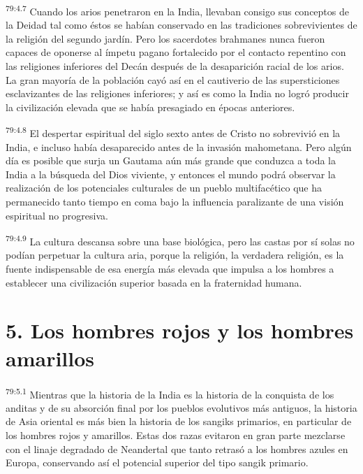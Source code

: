\par
\textsuperscript{79:4.7} Cuando los arios penetraron en la India, llevaban consigo sus conceptos de la Deidad tal como éstos se habían conservado en las tradiciones sobrevivientes de la religión del segundo jardín. Pero los sacerdotes brahmanes nunca fueron capaces de oponerse al ímpetu pagano fortalecido por el contacto repentino con las religiones inferiores del Decán después de la desaparición racial de los arios. La gran mayoría de la población cayó así en el cautiverio de las supersticiones esclavizantes de las religiones inferiores; y así es como la India no logró producir la civilización elevada que se había presagiado en épocas anteriores.

\par
\textsuperscript{79:4.8} El despertar espiritual del siglo sexto antes de Cristo no sobrevivió en la India, e incluso había desaparecido antes de la invasión mahometana. Pero algún día es posible que surja un Gautama aún más grande que conduzca a toda la India a la búsqueda del Dios viviente, y entonces el mundo podrá observar la realización de los potenciales culturales de un pueblo multifacético que ha permanecido tanto tiempo en coma bajo la influencia paralizante de una visión espiritual no progresiva.

\par
\textsuperscript{79:4.9} La cultura descansa sobre una base biológica, pero las castas por sí solas no podían perpetuar la cultura aria, porque la religión, la verdadera religión, es la fuente indispensable de esa energía más elevada que impulsa a los hombres a establecer una civilización superior basada en la fraternidad humana.

\section*{5. Los hombres rojos y los hombres amarillos}
\par
\textsuperscript{79:5.1} Mientras que la historia de la India es la historia de la conquista de los anditas y de su absorción final por los pueblos evolutivos más antiguos, la historia de Asia oriental es más bien la historia de los sangiks primarios, en particular de los hombres rojos y amarillos. Estas dos razas evitaron en gran parte mezclarse con el linaje degradado de Neandertal que tanto retrasó a los hombres azules en Europa, conservando así el potencial superior del tipo sangik primario.

